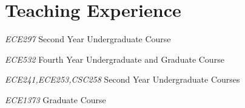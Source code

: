 \section{\sc Teaching Experience}

{\textit{ECE297}}{}
{
Second Year Undergraduate Course
}

{\textit{ECE532}}{}
{
Fourth Year Undergraduate and Graduate Course
}

{\textit{ECE241,ECE253,CSC258}}{}
{
Second Year Undergraduate Courses
}


{\textit{ECE1373}}{}
{
Graduate Course
}

